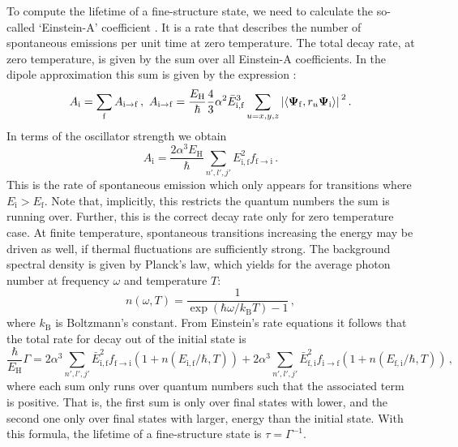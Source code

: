 \documentclass[fontsize=12pt,
               twoside=false,
               BCOR=0mm,
               DIV=14,
               overfullrule=true, %
               toc=bibliography,
               headinclude=true,
               footinclude=false]{scrartcl}
\numberwithin{equation}{section}
\newcommand{\EH}{E_\mathrm{H}}
\newcommand{\kBT}{k_\mathrm{B}T}
\begin{document}
    To compute the lifetime of a fine-structure state, we need to calculate the
    so-called `Einstein-A' coefficient \cite{einstein1917,friedrich2017}. It is
    a rate that describes the number of spontaneous emissions per unit time at
    zero temperature. The total decay rate, at zero temperature, is given by the
    sum over all Einstein-A coefficients. In the dipole approximation this sum
    is given by the expression \cite{friedrich2017}:
    \begin{equation}\label{eq:DecayRateGeneralForm}
        A_\mathrm{i}
        =
        \sum_\mathrm{f}
        A_{\mathrm{i}\to\mathrm{f}}
    \,, \
        A_{\mathrm{i}\to\mathrm{f}}
        =
        \frac{\EH}{\hbar} \frac{4}{3} \alpha^2 \bar{E}^3_\mathrm{i,f}
        \sum_{u=x,y,z}
        \abs*{\langle\bm{\Psi}_\mathrm{f},r_u\bm{\Psi}_\mathrm{i}\rangle}^2
    \,.
    \end{equation}
    In terms of the oscillator strength we obtain
    \begin{equation}
        A_\mathrm{i}
        =
        \frac{2\alpha^3\EH}{\hbar}
        \sum_{n',l',j'}
        E^2_\mathrm{i,f} f_{\mathrm{f}\to\mathrm{i}}
    \,.
    \end{equation}
    This is the rate of spontaneous emission which only appears for transitions
    where $E_\mathrm{i}>E_\mathrm{f}$. Note that, implicitly, this restricts the
    quantum numbers the sum is running over. Further, this is the correct decay
    rate only for zero temperature case. At finite temperature, spontaneous
    transitions increasing the energy may be driven as well, if thermal
    fluctuations are sufficiently strong. The background spectral density is
    given by Planck's law, which yields for the average photon number at
    frequency $\omega$ and temperature $T$:
    \begin{equation}
        n(\omega,T)
        =
        \frac{1}{\exp(\hbar\omega\slash\kBT)-1}
    \,,
    \end{equation}
    where $k_\mathrm{B}$ is Boltzmann's constant. From Einstein's rate equations
    \cite{einstein1917} it follows that the total rate for decay out of the
    initial state is
    \begin{equation}\label{eq:LifetimeFormula}
        \frac{\hbar}{\EH}\Gamma
        =
        2\alpha^3
        \sum_{n',l',j'}
        \bar{E}^2_\mathrm{i,f} f_{\mathrm{f}\to\mathrm{i}}
        (1+n(E_\mathrm{i,f}\slash\hbar,T))
        +
        2\alpha^3
        \sum_{n',l',j'}
        \bar{E}^2_\mathrm{f,i} f_{\mathrm{i}\to\mathrm{f}}
        (1+n(E_\mathrm{f,i}\slash\hbar,T))
    \,,
    \end{equation}
    where each sum only runs over quantum numbers such that the associated term
    is positive. That is, the first sum is only over final states with lower,
    and the second one only over final states with larger, energy than the
    initial state. With this formula, the lifetime of a fine-structure state is
    $\tau=\Gamma^{-1}$.
\end{document}
